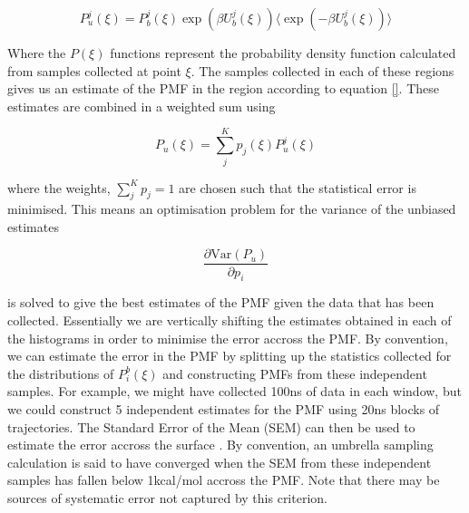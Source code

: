 \begin{equation}
	P_u^j(\xi) = P_b^j(\xi) \exp(\beta U_{b}^j (\xi)) \langle \exp(-\beta U_b^j (\xi))\rangle
\end{equation}

Where the $P(\xi)$  functions represent the probability density function calculated from samples collected at point $\xi$. The samples collected in each of these regions gives us an estimate of the PMF in the region according to equation \ref{}. These estimates are combined in a weighted sum using

\begin{equation}
	P_u(\xi) = \sum_j^K p_j(\xi)P_u^j (\xi)
\end{equation}

where the weights, $\sum_j^K p_j = 1$ are chosen such that the statistical error is minimised. This means an optimisation problem for the variance of the unbiased estimates

\begin{equation}
	\frac{\partial\text{Var} (P_u)}{\partial p_i}
\end{equation}

is solved to give the best estimates of the PMF given the data that has been collected. Essentially we are vertically shifting the estimates obtained in each of the histograms in order to minimise the error accross the PMF. By convention, we can estimate the error in the PMF by splitting up the statistics collected for the distributions of $P^b_i (\xi)$ and constructing PMFs from these independent samples. For example, we might have collected 100ns of data in each window, but we could construct 5 independent estimates for the PMF using 20ns blocks of trajectories. The Standard Error of the Mean (SEM) can then be used to estimate the error accross the surface \cite{gapsys2020}. By convention, an umbrella sampling calculation is said to have converged when the SEM from these independent samples has fallen below 1kcal/mol accross the PMF. Note that there may be sources of systematic error not captured by this criterion. 

